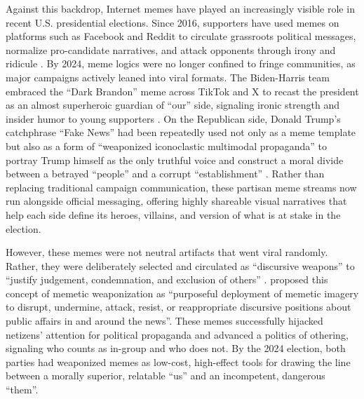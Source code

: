 \documentclass[12pt,twoside]{article}
\begin{document}
Against this backdrop, Internet memes have played an increasingly visible role in recent U.S. presidential elections. Since 2016, supporters have used memes on platforms such as Facebook and Reddit to circulate grassroots political messages, normalize pro-candidate narratives, and attack opponents through irony and ridicule \parencite{hunting2020popularmediamemes, moodyramirez2019facebookmemegroups}. By 2024, meme logics were no longer confined to fringe communities, as major campaigns actively leaned into viral formats. The Biden-Harris team embraced the ``Dark Brandon'' meme across TikTok and X to recast the president as an almost superheroic guardian of ``our'' side, signaling ironic strength and insider humor to young supporters \parencite{robertson2024bidenmemelord,mielczarek2024darkbrandonenthymeme}. On the Republican side, Donald Trump's catchphrase ``Fake News'' had been repeatedly used not only as a meme template but also as a form of ``weaponized iconoclastic multimodal propaganda'' \parencite[303]{smith2019weaponizediconoclasm} to portray Trump himself as the only truthful voice and construct a moral divide between a betrayed ``people'' and a corrupt ``establishment'' \parencite{ross2018discursivedeflection,woodward2020fakenewsguide}. Rather than replacing traditional campaign communication, these partisan meme streams now run alongside official messaging, offering highly shareable visual narratives that help each side define its heroes, villains, and version of what is at stake in the election.

However, these memes were not neutral artifacts that went viral randomly. Rather, they were deliberately selected and circulated as ``discursive weapons'' to ``justify judgement, condemnation, and exclusion of others'' \parencite[495]{nissenbaum2017contestedculturalcapital}. \textcite[218--219]{peters2021weaponizingmemes} proposed this concept of memetic weaponization as ``purposeful deployment of memetic imagery to disrupt, undermine, attack, resist, or reappropriate discursive positions about public affairs in and around the news''. These memes successfully hijacked netizens' attention for political propaganda \parencite{olsen2018weaponizedmemes} and advanced a politics of othering, signaling who counts as in-group and who does not. By the 2024 election, both parties had weaponized memes as low-cost, high-effect tools for drawing the line between a morally superior, relatable ``us'' and an incompetent, dangerous ``them''. 

\end{document}
